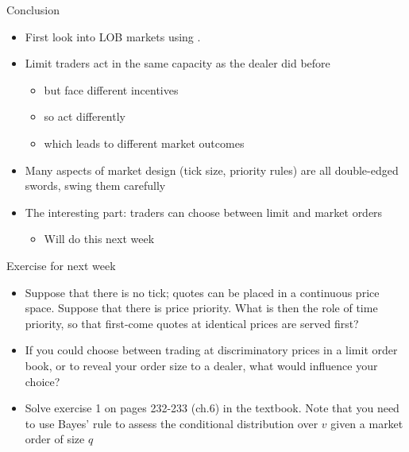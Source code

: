 \documentclass[english,10pt]{beamer}
\begin{document}
\begin{frame}{Conclusion}
	\begin{itemize}
		\item First look into LOB markets using \cite{glosten_is_1994}.
		\item Limit traders act in the same capacity as the dealer did before
		\begin{itemize}
			\item but face different incentives
			\item so act differently
			\item which leads to different market outcomes
		\end{itemize}
		\item Many aspects of market design (tick size, priority rules) are all double-edged swords, swing them carefully
		\item The interesting part: traders can choose between limit and market orders
		\begin{itemize}
			\item Will do this next week
		\end{itemize}
	\end{itemize}
\end{frame}


\begin{frame}{Exercise for next week}
	\begin{itemize}
		\item Suppose that there is no tick; quotes can  be placed in a continuous price space. Suppose that there is price priority. What is then the role of time priority, so that first-come quotes at identical prices are served first?
		\item If you could choose between trading at discriminatory prices in a limit order book, or to reveal your order size to a dealer, what would influence your choice?
		\item Solve exercise 1 on pages 232-233 (ch.6) in the textbook. Note that you need to use Bayes' rule to assess the conditional distribution over $v$ given a market order of size $q$
	\end{itemize}
\end{frame}
\end{document}
